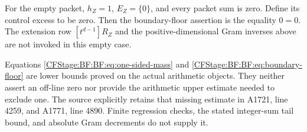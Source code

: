 For the empty packet, \(h_Z=1\), \(E_Z=\{0\}\), and every
packet sum is zero.  Define its control excess to be zero.
Then the boundary-floor assertion is the equality \(0=0\).
The extension row \([t^{d-1}]R_Z\) and the positive-dimensional
Gram inverses above are not invoked in this empty case.

Equations \eqref{CFStage:BF:BF:eq:one-sided-mass} and
\eqref{CFStage:BF:BF:eq:boundary-floor} are lower bounds proved on the
actual arithmetic objects.  They neither assert an off-line
zero nor provide the arithmetic upper estimate needed to
exclude one.  The source explicitly retains that missing
estimate in A1721, line 4259, and A1771, line 4890.
Finite regression checks, the stated integer-sum tail bound,
and absolute Gram decrements do not supply it.

